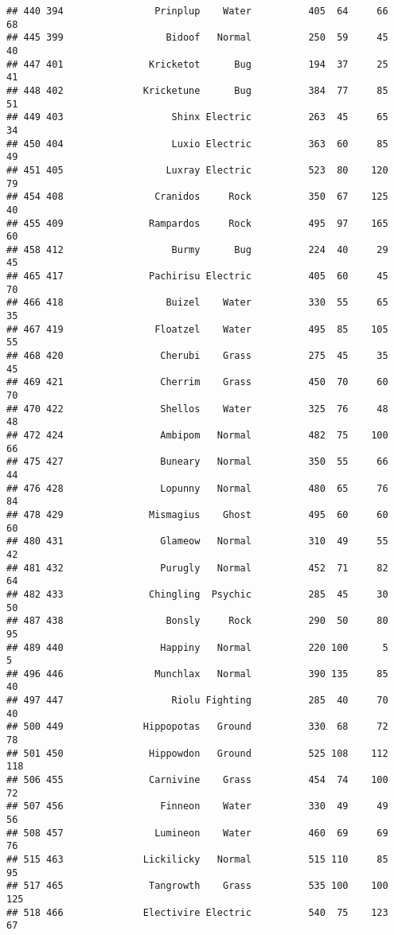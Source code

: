 \documentclass[
]{article}
\begin{document}
\begin{verbatim}
## 440 394                Prinplup    Water          405  64     66      68
## 445 399                  Bidoof   Normal          250  59     45      40
## 447 401               Kricketot      Bug          194  37     25      41
## 448 402              Kricketune      Bug          384  77     85      51
## 449 403                   Shinx Electric          263  45     65      34
## 450 404                   Luxio Electric          363  60     85      49
## 451 405                  Luxray Electric          523  80    120      79
## 454 408                Cranidos     Rock          350  67    125      40
## 455 409               Rampardos     Rock          495  97    165      60
## 458 412                   Burmy      Bug          224  40     29      45
## 465 417               Pachirisu Electric          405  60     45      70
## 466 418                  Buizel    Water          330  55     65      35
## 467 419                Floatzel    Water          495  85    105      55
## 468 420                 Cherubi    Grass          275  45     35      45
## 469 421                 Cherrim    Grass          450  70     60      70
## 470 422                 Shellos    Water          325  76     48      48
## 472 424                 Ambipom   Normal          482  75    100      66
## 475 427                 Buneary   Normal          350  55     66      44
## 476 428                 Lopunny   Normal          480  65     76      84
## 478 429               Mismagius    Ghost          495  60     60      60
## 480 431                 Glameow   Normal          310  49     55      42
## 481 432                 Purugly   Normal          452  71     82      64
## 482 433               Chingling  Psychic          285  45     30      50
## 487 438                  Bonsly     Rock          290  50     80      95
## 489 440                 Happiny   Normal          220 100      5       5
## 496 446                Munchlax   Normal          390 135     85      40
## 497 447                   Riolu Fighting          285  40     70      40
## 500 449              Hippopotas   Ground          330  68     72      78
## 501 450               Hippowdon   Ground          525 108    112     118
## 506 455               Carnivine    Grass          454  74    100      72
## 507 456                 Finneon    Water          330  49     49      56
## 508 457                Lumineon    Water          460  69     69      76
## 515 463              Lickilicky   Normal          515 110     85      95
## 517 465               Tangrowth    Grass          535 100    100     125
## 518 466              Electivire Electric          540  75    123      67

\end{verbatim}
\end{document}
